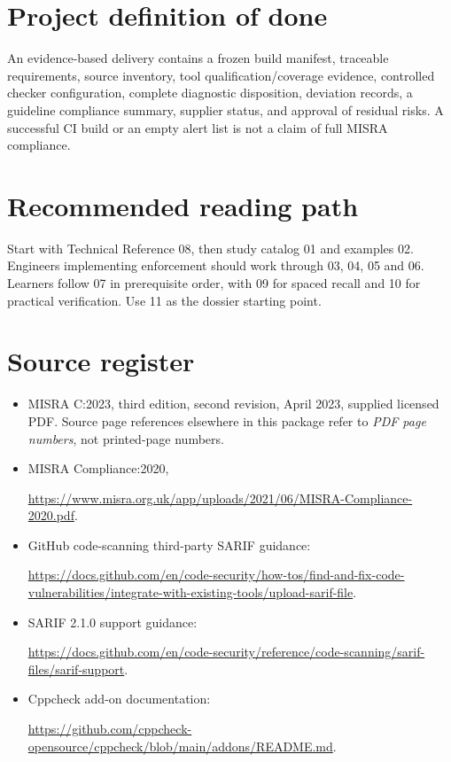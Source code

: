 \documentclass[10pt,letterpaper]{article}
\begin{document}
\section{Project definition of done}
An evidence-based delivery contains a frozen build manifest, traceable requirements, source inventory, tool qualification/coverage evidence, controlled checker configuration, complete diagnostic disposition, deviation records, a guideline compliance summary, supplier status, and approval of residual risks. A successful CI build or an empty alert list is not a claim of full MISRA compliance.
\section{Recommended reading path}
Start with Technical Reference 08, then study catalog 01 and examples 02. Engineers implementing enforcement should work through 03, 04, 05 and 06. Learners follow 07 in prerequisite order, with 09 for spaced recall and 10 for practical verification. Use 11 as the dossier starting point.
\section{Source register}
\begin{itemize}
\item MISRA C:2023, third edition, second revision, April 2023, supplied licensed PDF. Source page references elsewhere in this package refer to \emph{PDF page numbers}, not printed-page numbers.
\item MISRA Compliance:2020,\par\noindent \url{https://www.misra.org.uk/app/uploads/2021/06/MISRA-Compliance-2020.pdf}.
\item GitHub code-scanning third-party SARIF guidance:\par\noindent \url{https://docs.github.com/en/code-security/how-tos/find-and-fix-code-vulnerabilities/integrate-with-existing-tools/upload-sarif-file}.
\item SARIF 2.1.0 support guidance:\par\noindent \url{https://docs.github.com/en/code-security/reference/code-scanning/sarif-files/sarif-support}.
\item Cppcheck add-on documentation:\par\noindent \url{https://github.com/cppcheck-opensource/cppcheck/blob/main/addons/README.md}.
\end{itemize}
\end{document}
